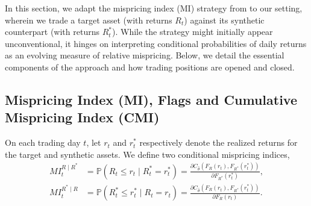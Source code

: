 In this section, we adapt the mispricing index (MI) strategy from \cite{Xie2016} to our setting, wherein we trade a target asset (with returns $R_t$) against its synthetic counterpart (with returns $R_t^*$). While the strategy might initially appear unconventional, it hinges on interpreting conditional probabilities of daily returns as an evolving measure of relative mispricing. Below, we detail the essential components of the approach and how trading positions are opened and closed.

\subsection{Mispricing Index (MI), Flags and Cumulative Mispricing Index (CMI)}

On each trading day $t$, let $r_t$ and $r_t^*$ respectively denote the realized returns for the target and synthetic assets. We define two conditional mispricing indices,
\begin{align*}
MI_t^{R \mid R^*} 
&= \mathbb{P}(R_t \leq r_t \mid R_t^* = r_t^*)
= 
\frac{\partial C_{\hat{\theta}}(F_R(r_t), F_{R^*}(r_t^*))}{\partial F_{R^*}(r_t^*)}
,
\\[0.4em]
MI_t^{R^* \mid R} 
&= \mathbb{P}(R_t^* \leq r_t^* \mid R_t = r_t)
= 
\frac{\partial C_{\hat{\theta}}(F_R(r_t), F_{R^*}(r_t^*))}{\partial F_R(r_t)}
.
\end{align*}

